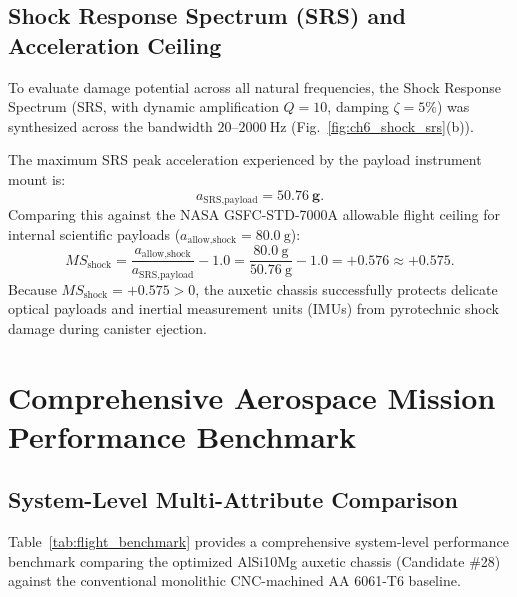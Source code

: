 \subsection{Shock Response Spectrum (SRS) and Acceleration Ceiling}

To evaluate damage potential across all natural frequencies, the Shock Response Spectrum (SRS, with dynamic amplification $Q = 10$, damping $\zeta = 5\%$) was synthesized across the bandwidth $20\text{--}\SI{2000}{\hertz}$ (Fig.~\ref{fig:ch6_shock_srs}(b)).

The maximum SRS peak acceleration experienced by the payload instrument mount is:
\begin{equation}
a_{\text{SRS,payload}} = \mathbf{50.76\ \text{g}}.
\label{eq:srs_peak}
\end{equation}
Comparing this against the NASA GSFC-STD-7000A allowable flight ceiling for internal scientific payloads ($a_{\text{allow,shock}} = \SI{80.0}{\text{g}}$):
\begin{equation}
MS_{\text{shock}} = \frac{a_{\text{allow,shock}}}{a_{\text{SRS,payload}}} - 1.0 = \frac{\SI{80.0}{\text{g}}}{\SI{50.76}{\text{g}}} - 1.0 = \mathbf{+0.576} \approx \mathbf{+0.575}.
\label{eq:ms_shock}
\end{equation}
Because $MS_{\text{shock}} = +0.575 > 0$, the auxetic chassis successfully protects delicate optical payloads and inertial measurement units (IMUs) from pyrotechnic shock damage during canister ejection.

\section{Comprehensive Aerospace Mission Performance Benchmark}
\label{sec:flight_benchmark}

\subsection{System-Level Multi-Attribute Comparison}

Table~\ref{tab:flight_benchmark} provides a comprehensive system-level performance benchmark comparing the optimized AlSi10Mg auxetic chassis (Candidate \#28) against the conventional monolithic CNC-machined AA 6061-T6 baseline.

